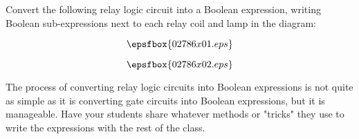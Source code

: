 

Convert the following relay logic circuit into a Boolean expression, writing Boolean sub-expressions next to each relay coil and lamp in the diagram:

\vskip 10pt

$$\epsfbox{02786x01.eps}$$







$$\epsfbox{02786x02.eps}$$







The process of converting relay logic circuits into Boolean expressions is not quite as simple as it is converting gate circuits into Boolean expressions, but it is manageable.  Have your students share whatever methods or "tricks" they use to write the expressions with the rest of the class.




